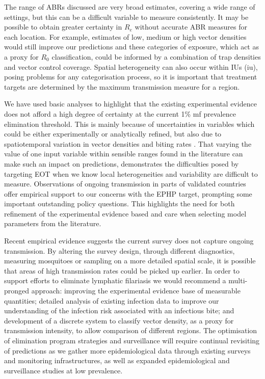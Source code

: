 The range of ABRs discussed are very broad estimates, covering a wide range of settings, but this can be a difficult variable to measure consistently. It may be possible to obtain greater certainty in $R_e$ without accurate ABR measures for each location. For example, estimates of low, medium or high vector densities would still improve our predictions and these categories of exposure, which act as a proxy for $R_0$ classification, could be informed by a combination of trap densities and vector control coverage. Spatial heterogeneity can also occur within \glspl{IU} (\acrshort{iu}), posing problems for any categorisation process, so it is important that treatment targets are determined by the maximum transmission measure for a region. 

We have used basic analyses to highlight that the existing experimental evidence does not afford a high degree of certainty at the current 1\% mf prevalence elimination threshold. This is mainly because of uncertainties in variables which could be either experimentally or analytically refined, but also due to spatiotemporal variation in vector densities and biting rates \cite{Michael2016}. That varying the value of one input variable within sensible ranges found in the literature can make such an impact on predictions, demonstrates the difficulties posed by targeting EOT when we know local heterogeneities and variability are difficult to measure. Observations of ongoing transmission in parts of validated countries offer empirical support to our concerns with the EPHP target, prompting some important outstanding policy questions. This highlights the need for both refinement of the experimental evidence based and care when selecting model parameters from the literature.

Recent empirical evidence suggests the current survey does not capture ongoing transmission. By altering the survey design, through different diagnostics, measuring mosquitoes or sampling on a more detailed spatial scale, it is possible that areas of high transmission rates could be picked up earlier. In order to support efforts to eliminate lymphatic filariasis we would recommend a multi-pronged approach: improving the experimental evidence base of measurable quantities; detailed analysis of existing infection data to improve our understanding of the infection risk associated with an infectious bite; and development of a discrete system to classify vector density, as a proxy for transmission intensity, to allow comparison of different regions. The optimisation of elimination program strategies and surveillance will require continual revisiting of predictions as we gather more epidemiological data through existing surveys and monitoring infrastructures, as well as expanded epidemiological and surveillance studies at low prevalence. 

